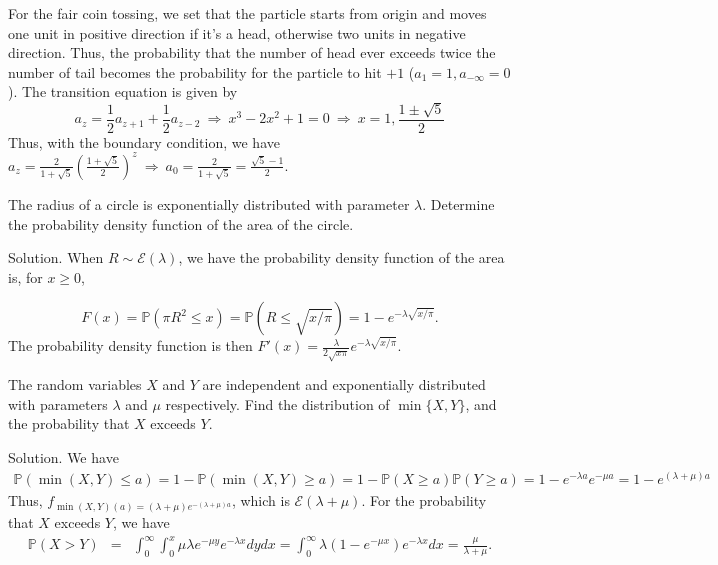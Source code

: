 For the fair coin tossing, we set that the particle starts from origin and moves one unit in positive direction if it's a head, otherwise two units in negative direction. Thus, the probability that the number of head ever exceeds twice the number of tail becomes the probability for the particle to hit $+1$ ($a_1=1, a_{-\infty}=0$). The transition equation is given by 
\begin{equation}
a_z = \frac 12 a_{z+1} + \frac 12a_{z-2} \ \Rightarrow \ x^3-2x^2+1 =0 \ \Rightarrow \ x=1,\frac{1\pm\sqrt{5}}{2}
\end{equation} 
Thus, with the boundary condition, we have $a_z = \frac{2}{1+\sqrt{5}}\left(\frac{1+\sqrt{5}}{2}\right)^z\ \Rightarrow \ a_0 = \frac{2}{1+\sqrt{5}} = \frac{\sqrt{5}-1}{2} $.


\item The radius of a circle is exponentially distributed with parameter $\lambda$. Determine the probability density function of the area of the circle.

Solution. When $R\sim \mathcal{E}(\lambda)$, we have the probability density function of the area is, for $x\geq 0$,

\begin{equation}
F(x) = \mathbb{P}(\pi R^2\leq x) =\mathbb{P}(R\leq \sqrt{x/\pi}) = 1 - e^{-\lambda\sqrt{x/\pi}}.
\end{equation}
The probability density function is then $F'(x)=\frac{\lambda}{2\sqrt{x\pi}}e^{-\lambda\sqrt{x/\pi}}$.


\item The random variables $X$ and $Y$ are independent and exponentially distributed with parameters $\lambda$ and $\mu$ respectively. Find the distribution of $\min\{X,Y\}$, and the probability that $X$ exceeds $Y$.

Solution. We have 
\begin{eqnarray}
\mathbb{P}(\min(X,Y)\leq a) = 1 - \mathbb{P}(\min(X,Y)\geq a) = 1 - \mathbb{P}(X\geq a)\mathbb{P}(Y\geq a) = 1 - e^{-\lambda a}e^{-\mu a} = 1-e^{(\lambda+\mu)a}
\end{eqnarray}
Thus, $f_{\min(X,Y)(a) = (\lambda+\mu)e^{-(\lambda+\mu)a}}$, which is $\mathcal{E}(\lambda+\mu)$. For the probability that $X$ exceeds $Y$, we have
\begin{eqnarray}
\mathbb{P}(X>Y) & = & \int^\infty_0\int^x_0 \mu\lambda e^{-\mu y} e^{-\lambda x}dydx = \int^\infty_0 \lambda(1-e^{-\mu x})e^{-\lambda x} dx = \frac{\mu}{\lambda+\mu}.
\end{eqnarray}





